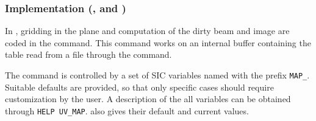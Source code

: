 \subsubsection{Implementation (,  and )}

In \imager{}, gridding in the \uv{} plane and computation of the dirty
beam and image are coded in the  command. This command works
on an internal buffer containing the \uv{} table read from a file through
the  command. 

The  command is controlled by a set of SIC variables named 
with the prefix \texttt{MAP\_}. Suitable defaults are provided, so that 
only specific cases should require customization by the user. A 
description of the all variables can be obtained through \texttt{HELP UV\_MAP}.
 also gives their default and current values.

